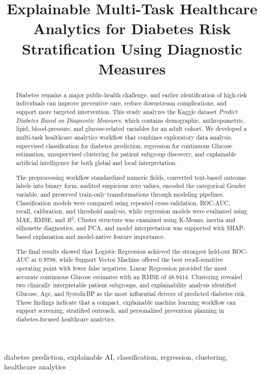 \documentclass[conference]{IEEEtran}
\title{Explainable Multi-Task Healthcare Analytics for Diabetes Risk Stratification Using Diagnostic Measures}
\author{
\IEEEauthorblockN{Maryam Ali \quad Maitha Alghfeli}
\IEEEauthorblockA{
Department of Data Science and Artificial Intelligence \\
College of Engineering and Information Technology \\
Ajman University \\
Ajman, United Arab Emirates \\
202512707@ajmanuni.ac.ae \quad 202512976@ajmanuni.ac.ae
}
}
\begin{document}
\pagestyle{empty}
\maketitle

\begin{abstract}
Diabetes remains a major public-health challenge, and earlier identification of high-risk individuals can improve preventive care, reduce downstream complications, and support more targeted intervention. This study analyzes the Kaggle dataset \textit{Predict Diabetes Based on Diagnostic Measures}, which contains demographic, anthropometric, lipid, blood-pressure, and glucose-related variables for an adult cohort. We developed a multi-task healthcare analytics workflow that combines exploratory data analysis, supervised classification for diabetes prediction, regression for continuous Glucose estimation, unsupervised clustering for patient subgroup discovery, and explainable artificial intelligence for both global and local interpretation.

The preprocessing workflow standardized numeric fields, converted text-based outcome labels into binary form, audited suspicious zero values, encoded the categorical Gender variable, and preserved train-only transformations through modeling pipelines. Classification models were compared using repeated cross-validation, ROC-AUC, recall, calibration, and threshold analysis, while regression models were evaluated using MAE, RMSE, and $R^2$. Cluster structure was examined using K-Means, inertia and silhouette diagnostics, and PCA, and model interpretation was supported with SHAP-based explanation and model-native feature importance.

The final results showed that Logistic Regression achieved the strongest held-out ROC-AUC at 0.9798, while Support Vector Machine offered the best recall-sensitive operating point with fewer false negatives. Linear Regression provided the most accurate continuous Glucose estimates with an RMSE of 48.9414. Clustering revealed two clinically interpretable patient subgroups, and explainability analysis identified Glucose, Age, and SystolicBP as the most influential drivers of predicted diabetes risk. These findings indicate that a compact, explainable machine learning workflow can support screening, stratified outreach, and personalized prevention planning in diabetes-focused healthcare analytics.
\end{abstract}

\begin{IEEEkeywords}
diabetes prediction, explainable AI, classification, regression, clustering, healthcare analytics
\end{IEEEkeywords}
\end{document}
